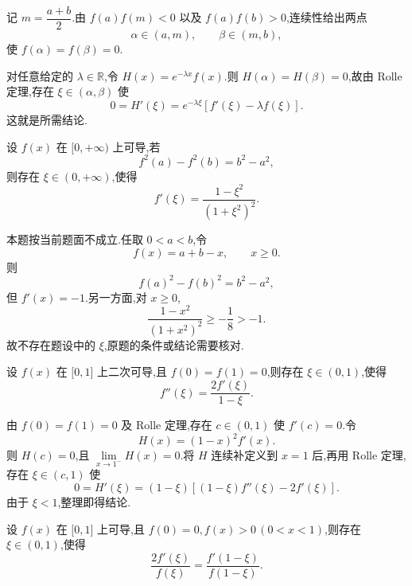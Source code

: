 \begin{solution}
    记 $m=\dfrac{a+b}{2}$.由 $f(a)f(m)<0$ 以及 $f(a)f(b)>0$,连续性给出两点
    \[
        \alpha\in(a,m),
        \qquad
        \beta\in(m,b),
    \]
    使 $f(\alpha)=f(\beta)=0$.

    对任意给定的 $\lambda\in\mathbb{R}$,令 $H(x)=e^{-\lambda x}f(x)$.则 $H(\alpha)=H(\beta)=0$,故由 Rolle 定理,存在 $\xi\in(\alpha,\beta)$ 使
    \[
        0=H'(\xi)=e^{-\lambda\xi}[f'(\xi)-\lambda f(\xi)].
    \]
    这就是所需结论.
\end{solution}

\begin{example}
    设 $f(x)$ 在 $\lbrack 0,+\infty)$ 上可导,若
    \[
        f^2(a)-f^2(b)=b^2-a^2,
    \]
    则存在 $\xi\in(0,+\infty)$,使得
    \[
        f'(\xi)=\dfrac{1-\xi^2}{(1+\xi^2)^2}.
    \]
\end{example}
\exampleblank

\begin{solution}
    本题按当前题面不成立.任取 $0<a<b$,令
    \[
        f(x)=a+b-x,
        \qquad x\geq0.
    \]
    则
    \[
        f(a)^2-f(b)^2=b^2-a^2,
    \]
    但 $f'(x)=-1$.另一方面,对 $x\geq0$,
    \[
        \dfrac{1-x^2}{(1+x^2)^2}\geq-\dfrac{1}{8}>-1.
    \]
    故不存在题设中的 $\xi$,原题的条件或结论需要核对.
\end{solution}

\begin{example}
    设 $f(x)$ 在 $\lbrack 0,1\rbrack$ 上二次可导,且 $f(0)=f(1)=0$,则存在 $\xi\in(0,1)$,使得
    \[
        f''(\xi)=\dfrac{2f'(\xi)}{1-\xi}.
    \]
\end{example}
\exampleblank

\begin{solution}
    由 $f(0)=f(1)=0$ 及 Rolle 定理,存在 $c\in(0,1)$ 使 $f'(c)=0$.令
    \[
        H(x)=(1-x)^2f'(x).
    \]
    则 $H(c)=0$,且 $\displaystyle\lim\limits_{x\to1^-}H(x)=0$.将 $H$ 连续补定义到 $x=1$ 后,再用 Rolle 定理,存在 $\xi\in(c,1)$ 使
    \[
        0=H'(\xi)
        =(1-\xi)[(1-\xi)f''(\xi)-2f'(\xi)].
    \]
    由于 $\xi<1$,整理即得结论.
\end{solution}

\begin{example}
    设 $f(x)$ 在 $\lbrack 0,1\rbrack$ 上可导,且 $f(0)=0,f(x)>0\,(0<x<1)$,则存在 $\xi\in(0,1)$,使得
    \[
        \dfrac{2f'(\xi)}{f(\xi)}
        =\dfrac{f'(1-\xi)}{f(1-\xi)}.
    \]
\end{example}
\exampleblank

